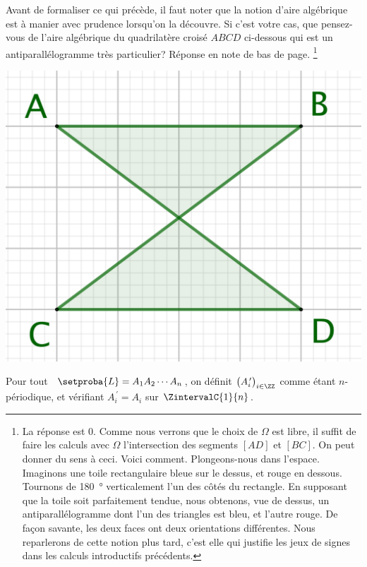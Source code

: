 Avant de formaliser ce qui précède, il faut noter que la notion d'aire algébrique est à manier avec prudence lorsqu'on la découvre.
Si c'est votre cas, que pensez-vous de l'aire algébrique du quadrilatère croisé $ABCD$ ci-dessous qui est un antiparallélogramme très particulier? Réponse en note de bas de page.%
\footnote{
    La réponse est $0$. Comme nous verrons que le choix de $\Omega$ est libre, il suffit de faire les calculs avec $\Omega$ l'intersection des segments $[AD]$ et $[BC]$.
    On peut donner du sens à ceci. Voici comment.
    Plongeons-nous dans l'espace.
    Imaginons une toile rectangulaire bleue sur le dessus, et rouge en dessous.
    Tournons de \qty{180}{\degree} verticalement l'un des côtés du rectangle.
    En supposant que la toile soit parfaitement tendue, nous obtenons, vue de dessus, un antiparallélogramme dont l'un des triangles est bleu, et l'autre rouge.
    De façon savante, les deux faces ont deux orientations différentes. Nous reparlerons de cette notion plus tard, c'est elle qui justifie les jeux de signes dans les calculs introductifs précédents.
}

\begin{center}
    \includegraphics[scale=.4]{content/polygon/at-least-one/anti-para.png}
\end{center}




\begin{defi} \label{garea-pt-ct}
    Pour tout \ncycle\ $\setproba{L} = A_1 A_2 \cdots A_n$, on définit $\big( A^{\,\prime}_i \big)_{i \in \ZZ}$ comme étant $n$-périodique, et vérifiant $A^{\,\prime}_{i} = A_i$ sur $\ZintervalC{1}{n}$.
\end{defi}


